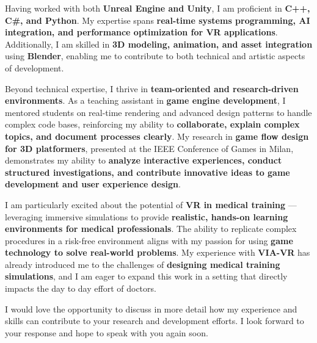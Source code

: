 \documentclass[11pt, a4paper]{awesome-cv}
\begin{document}
\begin{cvletter}
  Having worked with both \textbf{Unreal Engine and Unity},
  I am proficient in \textbf{C++, C\#, and Python}. 
  My expertise spans \textbf{real-time systems programming, AI integration, and performance optimization for VR applications}. 
  Additionally, I am skilled in \textbf{3D modeling, animation, and asset integration} using \textbf{Blender}, 
  enabling me to contribute to both technical and artistic aspects of development.
  
  Beyond technical expertise, 
  I thrive in \textbf{team-oriented and research-driven environments}. 
  As a teaching assistant in \textbf{game engine development}, 
  I mentored students on real-time rendering and advanced design patterns to handle complex code bases, 
  reinforcing my ability to \textbf{collaborate, explain complex topics, and document processes clearly}. 
  My research in \textbf{game flow design for 3D platformers}, presented at the IEEE Conference of Games in Milan, 
  demonstrates my ability to 
  \textbf{analyze interactive experiences, conduct structured investigations, and contribute innovative ideas to game development 
  and user experience design}.
  
  I am particularly excited about the potential of \textbf{VR in medical training}
  —leveraging immersive simulations to provide \textbf{realistic, hands-on learning environments for medical professionals}. 
  The ability to replicate complex procedures in a risk-free environment aligns with my passion for using 
  \textbf{game technology to solve real-world problems}. 
  My experience with \textbf{VIA-VR} has already introduced me to the challenges of 
  \textbf{designing medical training simulations}, and I am eager to expand this work in a setting that directly impacts the day to day effort of doctors.
  
  I would love the opportunity to discuss in more detail how my experience and skills can contribute to your research and development efforts. 
  I look forward to your response and hope to speak with you again soon.
  
\end{cvletter}


\makeletterclosing
\end{document}
